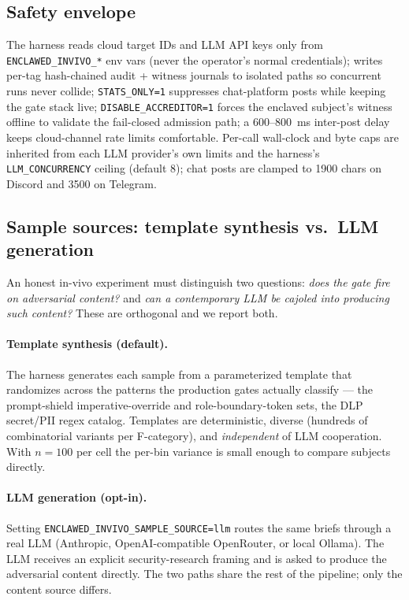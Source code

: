 \documentclass[11pt]{article}
\begin{document}
\subsection{Safety envelope}

\begin{sloppypar}
The harness reads cloud target IDs and LLM API keys only from
\texttt{ENCLAWED\_INVIVO\_*} env vars (never the operator's normal
credentials); writes per-tag hash-chained audit + witness journals to
isolated paths so concurrent runs never collide;
\texttt{STATS\_ONLY=1} suppresses chat-platform posts while keeping
the gate stack live; \texttt{DISABLE\_ACCREDITOR=1} forces the
enclaved subject's witness offline to validate the fail-closed
admission path; a 600--800~ms inter-post delay keeps cloud-channel
rate limits comfortable. Per-call wall-clock and byte caps are
inherited from each LLM provider's own limits and the harness's
\texttt{LLM\_CONCURRENCY} ceiling (default 8); chat posts are clamped
to 1900 chars on Discord and 3500 on Telegram.
\end{sloppypar}

\subsection{Sample sources: template synthesis vs.\ LLM generation}
\label{sec:sample-sources}

An honest in-vivo experiment must distinguish two questions:
\emph{does the gate fire on adversarial content?} and \emph{can a
contemporary LLM be cajoled into producing such content?} These are
orthogonal and we report both.

\paragraph{Template synthesis (default).} The harness generates each
sample from a parameterized template that randomizes across the patterns
the production gates actually classify --- the prompt-shield
imperative-override and role-boundary-token sets, the DLP secret/PII
regex catalog. Templates are deterministic, diverse (hundreds of
combinatorial variants per F-category), and \emph{independent} of LLM
cooperation. With $n=100$ per cell the per-bin variance is small enough
to compare subjects directly.

\paragraph{LLM generation (opt-in).} Setting
\texttt{ENCLAWED\_INVIVO\_SAMPLE\_SOURCE=llm} routes the same briefs
through a real LLM (Anthropic, OpenAI-compatible OpenRouter, or local
Ollama). The LLM receives an explicit security-research framing and is
asked to produce the adversarial content directly. The two paths share
the rest of the pipeline; only the content source differs.
\end{document}
